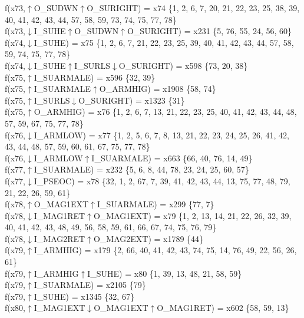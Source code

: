f(x73,$\uparrow$O\_SUDWN$\uparrow$O\_SURIGHT) = x74 \{1, 2, 6, 7, 20, 21, 22, 23, 25, 38, 39, 40, 41, 42, 43, 44, 57, 58, 59, 73, 74, 75, 77, 78\} \\  
f(x73,$\downarrow$I\_SUHE$\uparrow$O\_SUDWN$\uparrow$O\_SURIGHT) = x231 \{5, 76, 55, 24, 56, 60\} \\  
f(x74,$\downarrow$I\_SUHE) = x75 \{1, 2, 6, 7, 21, 22, 23, 25, 39, 40, 41, 42, 43, 44, 57, 58, 59, 74, 75, 77, 78\} \\  
f(x74,$\downarrow$I\_SUHE$\uparrow$I\_SURLS$\downarrow$O\_SURIGHT) = x598 \{73, 20, 38\} \\  
f(x75,$\uparrow$I\_SUARMALE) = x596 \{32, 39\} \\  
f(x75,$\uparrow$I\_SUARMALE$\uparrow$O\_ARMHIG) = x1908 \{58, 74\} \\  
f(x75,$\uparrow$I\_SURLS$\downarrow$O\_SURIGHT) = x1323 \{31\} \\  
f(x75,$\uparrow$O\_ARMHIG) = x76 \{1, 2, 6, 7, 13, 21, 22, 23, 25, 40, 41, 42, 43, 44, 48, 57, 59, 67, 75, 77, 78\} \\  
f(x76,$\downarrow$I\_ARMLOW) = x77 \{1, 2, 5, 6, 7, 8, 13, 21, 22, 23, 24, 25, 26, 41, 42, 43, 44, 48, 57, 59, 60, 61, 67, 75, 77, 78\} \\  
f(x76,$\downarrow$I\_ARMLOW$\uparrow$I\_SUARMALE) = x663 \{66, 40, 76, 14, 49\} \\  
f(x77,$\uparrow$I\_SUARMALE) = x232 \{5, 6, 8, 44, 78, 23, 24, 25, 60, 57\} \\  
f(x77,$\downarrow$I\_PSEOC) = x78 \{32, 1, 2, 67, 7, 39, 41, 42, 43, 44, 13, 75, 77, 48, 79, 21, 22, 26, 59, 61\} \\  
f(x78,$\uparrow$O\_MAG1EXT$\uparrow$I\_SUARMALE) = x299 \{77, 7\} \\  
f(x78,$\downarrow$I\_MAG1RET$\uparrow$O\_MAG1EXT) = x79 \{1, 2, 13, 14, 21, 22, 26, 32, 39, 40, 41, 42, 43, 48, 49, 56, 58, 59, 61, 66, 67, 74, 75, 76, 79\} \\  
f(x78,$\downarrow$I\_MAG2RET$\uparrow$O\_MAG2EXT) = x1789 \{44\} \\  
f(x79,$\uparrow$I\_ARMHIG) = x179 \{2, 66, 40, 41, 42, 43, 74, 75, 14, 76, 49, 22, 56, 26, 61\} \\  
f(x79,$\uparrow$I\_ARMHIG$\uparrow$I\_SUHE) = x80 \{1, 39, 13, 48, 21, 58, 59\} \\  
f(x79,$\uparrow$I\_SUARMALE) = x2105 \{79\} \\  
f(x79,$\uparrow$I\_SUHE) = x1345 \{32, 67\} \\  
f(x80,$\uparrow$I\_MAG1EXT$\downarrow$O\_MAG1EXT$\uparrow$O\_MAG1RET) = x602 \{58, 59, 13\} \\  
